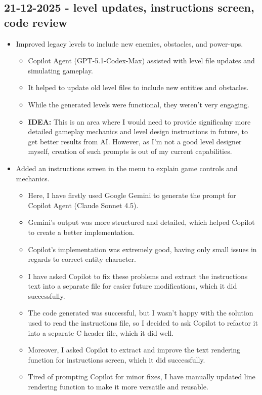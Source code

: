\documentclass[11pt,a4paper]{article}
\begin{document}
\subsection{21-12-2025 - level updates, instructions screen, code review}
\begin{itemize}
    \item Improved legacy levels to include new enemies, obstacles, and power-ups.
    \begin{itemize}
        \item Copilot Agent (GPT-5.1-Codex-Max) assisted with level file updates and simulating gameplay.
        \item It helped to update old level files to include new entities and obstacles.
        \item While the generated levels were functional, they weren't very engaging.
        \item \textbf{IDEA:} This is an area where I would need to provide significalny more detailed gameplay mechanics and level design instructions in future, to get better results from AI. However, as I'm not a good level designer myself, creation of such prompts is out of my current capabilities.
    \end{itemize}
    
    \item Added an instructions screen in the menu to explain game controls and mechanics.
    \begin{itemize}
        \item Here, I have firstly used Google Gemini to generate the prompt for Copilot Agent (Claude Sonnet 4.5).
        \item Gemini's output was more structured and detailed, which helped Copilot to create a better implementation.
        \item Copilot's implementation was extremely good, having only small issues in regards to correct entity character.
        \item I have asked Copilot to fix these problems and extract the instructions text into a separate file for easier future modifications, which it did successfully.
        \item The code generated was successful, but I wasn't happy with the solution used to read the instructions file, so I decided to ask Copilot to refactor it into a separate C header file, which it did well.
        \item Moreover, I asked Copilot to extract and improve the text rendering function for instructions screen, which it did successfully.
        \item Tired of prompting Copilot for minor fixes, I have manually updated line rendering function to make it more versatile and reusable.
    \end{itemize}
    

\end{itemize}
\end{document}
